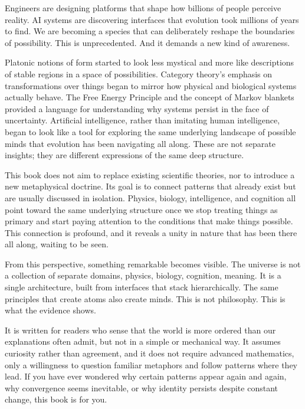 \documentclass[
  openright]{book}
\begin{document}
Engineers are designing platforms that shape how billions of people
perceive reality. AI systems are discovering interfaces that evolution
took millions of years to find. We are becoming a species that can
deliberately reshape the boundaries of possibility. This is
unprecedented. And it demands a new kind of awareness.

Platonic notions of form started to look less mystical and
more like descriptions of stable regions in a space of possibilities.
Category theory's emphasis on transformations
over things began to mirror how physical and biological systems actually
behave. The Free Energy Principle and the
concept of Markov blankets provided a language for
understanding why systems persist in the face of uncertainty. Artificial
intelligence, rather than imitating human intelligence, began to look
like a tool for exploring the same underlying landscape of possible
minds that evolution has been navigating all along. These are not
separate insights; they are different expressions of the same deep
structure.

This book does not aim to replace existing scientific theories, nor to
introduce a new metaphysical doctrine. Its goal is to connect patterns
that already exist but are usually discussed in isolation. Physics,
biology, intelligence, and cognition all point toward the same
underlying structure once we stop treating things as primary and start
paying attention to the conditions that make things possible. This
connection is profound, and it reveals a unity in nature that has been
there all along, waiting to be seen.

From this perspective, something remarkable becomes visible. The
universe is not a collection of separate domains, physics, biology,
cognition, meaning. It is a single architecture, built from interfaces
that stack hierarchically. The same principles that create atoms also
create minds. This is not philosophy. This is what the evidence shows.

It is written for readers who sense that the world is more ordered than
our explanations often admit, but not in a simple or mechanical way. It
assumes curiosity rather than agreement, and it does not require
advanced mathematics, only a willingness to question familiar metaphors
and follow patterns where they lead. If you have ever wondered why
certain patterns appear again and again, why convergence seems
inevitable, or why identity persists despite constant change, this book
is for you.
\end{document}
